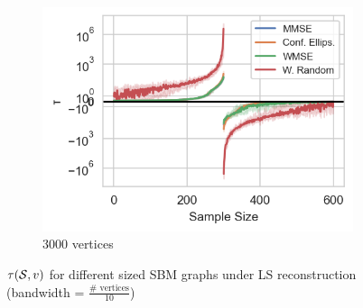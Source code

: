 \begin{figure}
\begin{subfigure}{0.3\columnwidth}
    \includegraphics[width=\columnwidth]{figures/proj1/plots/LS_threshold/SBM_3000_bandwidth_300_thresholds_LS.png}%
    \caption{3000 vertices}%
    \label{snr_SBM_3000}%
    \end{subfigure}%
    \caption{$\tau(\mathcal{S},v)$ for different sized SBM graphs under LS reconstruction (bandwidth = $\frac{\# \text{ vertices}}{10}$)}
\label{LS_SNR_Threshold_plots_big_SBM}
\end{figure}

